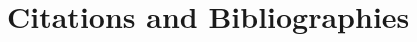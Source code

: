 \documentclass[acmlarge]{acmart}
\begin{document}


\section{Citations and Bibliographies}







\end{document}
